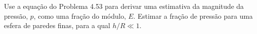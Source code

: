 Use a equação do Problema 4.53 para derivar uma estimativa da magnitude da pressão, $p$, como uma fração do módulo, $E$. Estimar a fração de pressão para uma esfera de paredes finas, para a qual $h/R \ll 1$.


